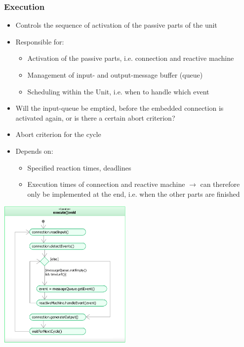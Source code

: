 \begin{paracol}{2}
    \subsubsection{Execution}
    \begin{itemize}
        \item Controls the sequence of activation of the passive parts of the unit
        \item Responsible for:
              \begin{itemize}
                  \item Activation of the passive parts, i.e. connection and reactive machine
                  \item Management of input- and output-message buffer (queue)
                  \item Scheduling within the Unit, i.e. when to handle which event
              \end{itemize}
        \item Will the input-queue be emptied, before the embedded connection is activated again, or is there a certain abort criterion?
        \item Abort criterion for the cycle
        \item Depends on:
              \begin{itemize}
                  \item Specified reaction times, deadlines
                  \item Execution times of connection and reactive machine $\rightarrow$ can therefore only be implemented at the end, i.e. when the other parts are finished
              \end{itemize}
    \end{itemize}

    \switchcolumn

    \includegraphics[width=0.49\textwidth]{images/Modeling/execute.png}
\end{paracol}

